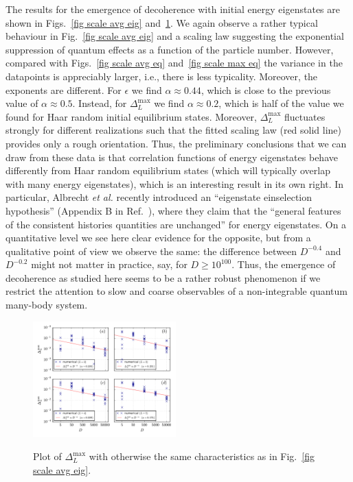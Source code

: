 \documentclass[pre,twocolumn,10pt,aps,longbibliography,nofootinbib]{revtex4-1}
\newcommand{\blue}[1]{#1}
\newcommand{\new}[1]{#1}
\begin{document}
The results for the emergence of \new{decoherence} with initial energy eigenstates are shown in Figs.~\ref{fig scale avg eig} and~\ref{fig scale max eig}. We again observe a rather typical behaviour \blue{in Fig.~\ref{fig scale avg eig}} and a scaling law suggesting the exponential suppression of quantum effects as a function of the particle number. However, compared with Figs.~\ref{fig scale avg eq} and~\ref{fig scale max eq} the variance in the datapoints is appreciably larger, i.e., there is less typicality. Moreover, the exponents are different. For $\epsilon$ we find $\alpha \approx 0.44$, which is close to the previous value of $\alpha\approx0.5$. Instead, for $\Delta_L^\text{max}$ we find $\alpha\approx0.2$, which is half of the value we found for Haar random initial equilibrium states. \blue{Moreover, $\Delta_L^\text{max}$ fluctuates strongly for different realizations such that the fitted scaling law (red solid line) provides only a rough orientation. Thus,} the preliminary conclusions that we can draw from these data is that \new{correlation functions of} energy eigenstates behave differently from Haar random equilibrium states (which will typically overlap with many energy eigenstates)\new{, which is an interesting result in its own right. In particular, Albrecht \emph{et al.} recently introduced an ``eigenstate einselection hypothesis'' (Appendix B in Ref.~\cite{AlbrechtBaunachArrasmithPRD2022}), where they claim that the ``general features of the consistent histories quantities are unchanged'' for energy eigenstates. On a quantitative level we see here clear evidence for the opposite, but} from a qualitative point of view we observe the same: the difference between $D^{-0.4}$ and $D^{-0.2}$ might not matter in practice, say, for $D\ge 10^{100}$. Thus, the emergence of \new{decoherence} as studied here seems to be a rather robust phenomenon if we restrict the attention to slow and coarse observables of a non-integrable quantum many-body system.

\begin{figure}[t]
 \centering\includegraphics[width=0.49\textwidth,clip=true]{Max_001_eig.pdf}
 \label{fig scale max eig}\vspace{-0.5cm}
 \caption{Plot of $\Delta_L^\text{max}$ with otherwise the same characteristics as in Fig.~\ref{fig scale avg eig}. }
\end{figure}
\end{document}
